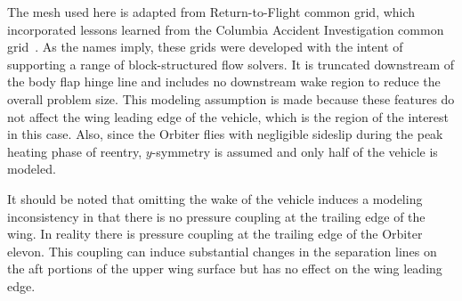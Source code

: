 The mesh used here is adapted from Return-to-Flight common grid, which incorporated lessons learned from the Columbia Accident Investigation common grid~\cite{alter_CAI_common_grid}. As the names imply, these grids were developed with the intent of supporting a range of block-structured flow solvers. It is truncated downstream of the body flap hinge line  and includes no downstream wake region to reduce the overall problem size.  This modeling assumption is made because these features do not affect the wing leading edge of the vehicle, which is the region of the interest in this case.  Also, since the Orbiter flies with negligible sideslip during the peak heating phase of reentry, $y$-symmetry is assumed and only half of the vehicle is modeled.

It should be noted that omitting the wake of the vehicle induces a modeling inconsistency in that there is no pressure coupling at the trailing edge of the wing.  In reality there is pressure coupling at the trailing edge of the Orbiter elevon.  This coupling can induce substantial changes in the separation lines on the aft portions of the upper wing surface but has no effect on the wing leading edge.

